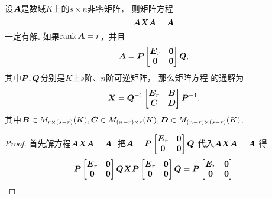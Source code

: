 \begin{theorem}[广义逆存在定理]\label{theorem:线性方程组.广义逆1}
设\(\boldsymbol{A}\)是数域\(K\)上的\(s \times n\)非零矩阵，
则矩阵方程\begin{equation}\label{equation:线性方程组.广义逆1矩阵方程}
	\boldsymbol{A} \boldsymbol{X} \boldsymbol{A} = \boldsymbol{A}
\end{equation}一定有解.
如果\(\rank\boldsymbol{A}=r\)，并且\begin{equation*}
	\boldsymbol{A}
	= \boldsymbol{P}
	\begin{bmatrix}
		\boldsymbol{E}_r & \boldsymbol0 \\
		\boldsymbol0 & \boldsymbol0
	\end{bmatrix}
	\boldsymbol{Q},
\end{equation*}
其中\(\boldsymbol{P},\boldsymbol{Q}\)分别是\(K\)上\(s\)阶、\(n\)阶可逆矩阵，
那么矩阵方程  的通解为
\begin{equation}\label{equation:线性方程组.广义逆1矩阵方程的通解}
	\boldsymbol{X}
	= \boldsymbol{Q}^{-1}
	\begin{bmatrix}
		\boldsymbol{E}_r & \boldsymbol{B} \\
		\boldsymbol{C} & \boldsymbol{D}
	\end{bmatrix}
	\boldsymbol{P}^{-1},
\end{equation}
其中\(\boldsymbol{B}\in M_{r\times(s-r)}(K),
\boldsymbol{C}\in M_{(n-r)\times r}(K),
\boldsymbol{D}\in M_{(n-r)\times(s-r)}(K)\).
\begin{proof}
首先解方程\(\boldsymbol{A} \boldsymbol{X} \boldsymbol{A} = \boldsymbol{A}\).
把\(
	\boldsymbol{A}
	= \boldsymbol{P}
	\begin{bmatrix}
		\boldsymbol{E}_r & \boldsymbol0 \\
		\boldsymbol0 & \boldsymbol0
	\end{bmatrix}
	\boldsymbol{Q}
\)
代入\(\boldsymbol{A} \boldsymbol{X} \boldsymbol{A} = \boldsymbol{A}\)
得\begin{equation*}
	\vb{P}
	\begin{bmatrix}
		\vb{E}_r & \vb0 \\
		\vb0 & \vb0
	\end{bmatrix}
	\vb{Q} \vb{X} \vb{P}
	\begin{bmatrix}
		\vb{E}_r & \vb0 \\
		\vb0 & \vb0
	\end{bmatrix}
	\vb{Q}
	= \vb{P}
	\begin{bmatrix}
		\vb{E}_r & \vb0 \\
		\vb0 & \vb0
	\end{bmatrix}

\end{equation*}
\end{proof}
\end{theorem}
